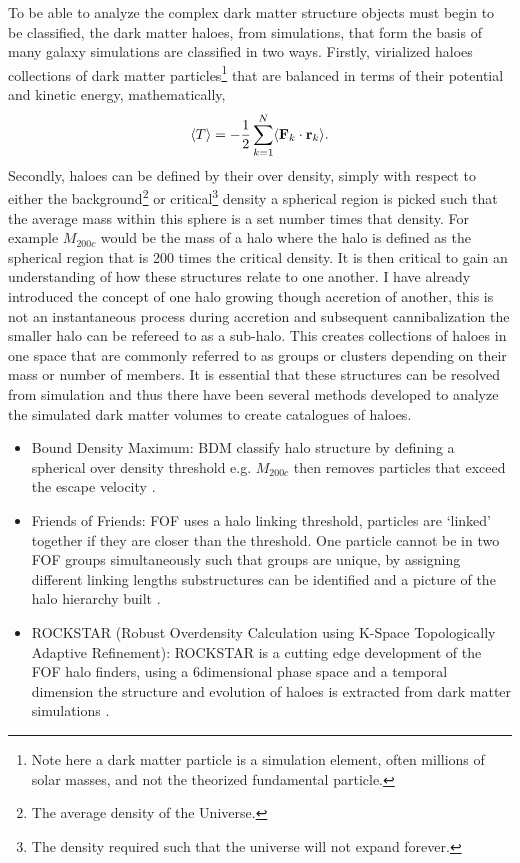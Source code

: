 To be able to analyze the complex dark matter structure objects must begin to be classified, the dark matter haloes, from simulations, that form the basis of many galaxy simulations are classified in two ways. Firstly, virialized haloes collections of dark matter particles\footnote{Note here a dark matter particle is a simulation element, often millions of solar masses, and not the theorized fundamental particle.} that are balanced in terms of their potential and kinetic energy, mathematically, 
\begin{equation}
    \langle T \rangle = -\frac{1}{2}\sum^{N}_{k=1}\langle \bold{F}_k \cdot \bold{r}_k \rangle.
\end{equation}
Secondly, haloes can be defined by their over density, simply with respect to either the background\footnote{The average density of the Universe.} or critical\footnote{The density required such that the universe will not expand forever.} density a spherical region is picked such that the average mass within this sphere is a set number times that density. For example $M_{200c}$ would be the mass of a halo where the halo is defined as the spherical region that is 200 times the critical density. It is then critical to gain an understanding of how these structures relate to one another. I have already introduced the concept of one halo growing though accretion of another, this is not an instantaneous process during accretion and subsequent cannibalization the smaller halo can be refereed to as a sub-halo. This creates collections of haloes in one space that are commonly referred to as groups or clusters depending on their mass or number of members. It is essential that these structures can be resolved from simulation and thus there have been several methods developed to analyze the simulated dark matter volumes to create catalogues of haloes. 

\begin{itemize}
    \item Bound Density Maximum: BDM classify halo structure by defining a spherical over density threshold e.g. $M_{200c}$ then removes particles that exceed the escape velocity \citep{Klypin1997Particle-MeshSimulations}.
    \item Friends of Friends: FOF uses a halo linking threshold, particles are `linked' together if they are closer than the threshold. One particle cannot be in two FOF groups simultaneously such that groups are unique, by assigning different linking lengths substructures can be identified and a picture of the halo hierarchy built \citep{Davis1985THEMATTER}.
    \item ROCKSTAR (Robust Overdensity Calculation using K-Space Topologically Adaptive Refinement): ROCKSTAR is a cutting edge development of the FOF halo finders, using a 6dimensional phase space and a temporal dimension the structure and evolution of haloes is extracted from dark matter simulations \citep{Behroozi2013TheCores}.
\end{itemize}

